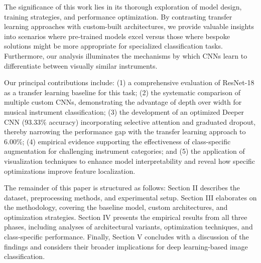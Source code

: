 The significance of this work lies in its thorough exploration of model design, training strategies, and performance optimization. By contrasting transfer learning approaches with custom-built architectures, we provide valuable insights into scenarios where pre-trained models excel versus those where bespoke solutions might be more appropriate for specialized classification tasks. Furthermore, our analysis illuminates the mechanisms by which CNNs learn to differentiate between visually similar instruments.

Our principal contributions include: (1) a comprehensive evaluation of ResNet-18 as a transfer learning baseline for this task; (2) the systematic comparison of multiple custom CNNs, demonstrating the advantage of depth over width for musical instrument classification; (3) the development of an optimized Deeper CNN (93.33\% accuracy) incorporating selective attention and graduated dropout, thereby narrowing the performance gap with the transfer learning approach to 6.00\%; (4) empirical evidence supporting the effectiveness of class-specific augmentation for challenging instrument categories; and (5) the application of visualization techniques to enhance model interpretability and reveal how specific optimizations improve feature localization.

The remainder of this paper is structured as follows: Section II describes the dataset, preprocessing methods, and experimental setup. Section III elaborates on the methodology, covering the baseline model, custom architectures, and optimization strategies. Section IV presents the empirical results from all three phases, including analyses of architectural variants, optimization techniques, and class-specific performance. Finally, Section V concludes with a discussion of the findings and considers their broader implications for deep learning-based image classification.
